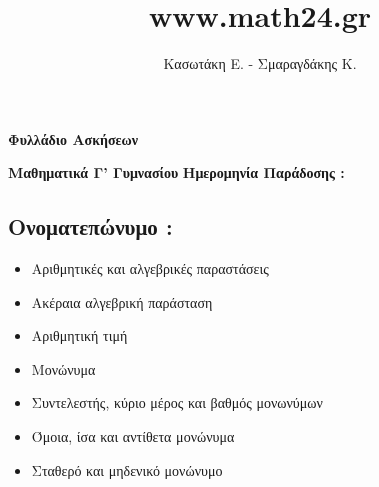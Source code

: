 \documentclass[a4paper,10pt]{report}
\author{Κασωτάκη Ε. - Σμαραγδάκης Κ.}
\title{www.math24.gr}
\begin{document}
\pagestyle{fancy}
\fancyhead{}
\fancyfoot{}
\renewcommand{\headrulewidth}{0pt}
\renewcommand{\footrulewidth}{0pt}


 
\begin{shaded}
\begin{center}
\huge \textbf{Φυλλάδιο Ασκήσεων}\\
\end{center} 
\textbf{Μαθηματικά Γ' Γυμνασίου} \hfill \textbf{Ημερομηνία Παράδοσης : \hspace{2em} }
\subsection*{Ονοματεπώνυμο :\hfill  \hspace{5em}}
\end{shaded}
\vspace{2em}
\begin{itemize}
 \item Αριθμητικές και αλγεβρικές παραστάσεις
 \item Ακέραια αλγεβρική παράσταση
 \item Αριθμητική τιμή
 \item Μονώνυμα
 \item Συντελεστής, κύριο μέρος και βαθμός μονωνύμων
 \item Όμοια, ίσα και αντίθετα μονώνυμα
 \item Σταθερό και μηδενικό μονώνυμο
\end{itemize}
\end{document}
